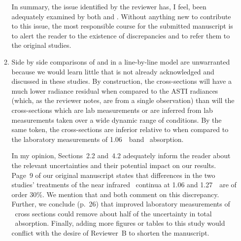 \documentclass[12pt,twoside]{article}
\begin{document}
\begin{enumerate}
\begin{enumerate}
In summary, the issue identified by the reviewer has, I feel, been
adequately examined by both \citeauthor{SPS98} and
\citeauthor{MCB98}. 
Without anything new to contribute to this issue, the most responsible 
course for the submitted manuscript is to alert the reader to the
existence of discrepancies and to refer them to the original studies. 

\item Side by side comparisons of \cite{MCB98} and \cite{SPS98} in a
line-by-line model are unwarranted because we would learn little that
is not already acknowledged and discussed in these studies.
By construction, the \citeauthor{MCB98} cross-sections will have a
much lower radiance residual when compared to the ASTI radiances
(which, as the reviewer notes, are from a single observation)
than will the \citeauthor{SPS98} cross-sections which are lab
measurements or are inferred from lab measurements taken over a wide 
dynamic range of conditions.
By the same token, the \citeauthor{MCB98} cross-sections are inferior
relative to \citeauthor{SPS98} when compared to the \cite{GOB90}
laboratory measurements of 1.06~\um\ band \OdOd\ absorption. 

In my opinion, Sections~2.2 and~4.2 adequately inform the reader about
the relevant uncertainties and their potential impact on our results.
Page~9 of our original manuscript states that differences in the two
studies' treatments of the near infrared \OdX\ continua at 1.06 and
1.27~\um\ are of order 30\%.  
We mention that \cite{MCB98} and \cite{SPS98} both comment on
this discrepancy.
Further, we conclude (p.~26) that improved laboratory measurements of
\OdX\ cross sections could remove about half of the uncertainty in
total \OdX\ absorption. 
Finally, adding more figures or tables to this study would conflict
with the desire of Reviewer~B to shorten the manuscript.


\end{enumerate}
\end{enumerate}
\end{document}
